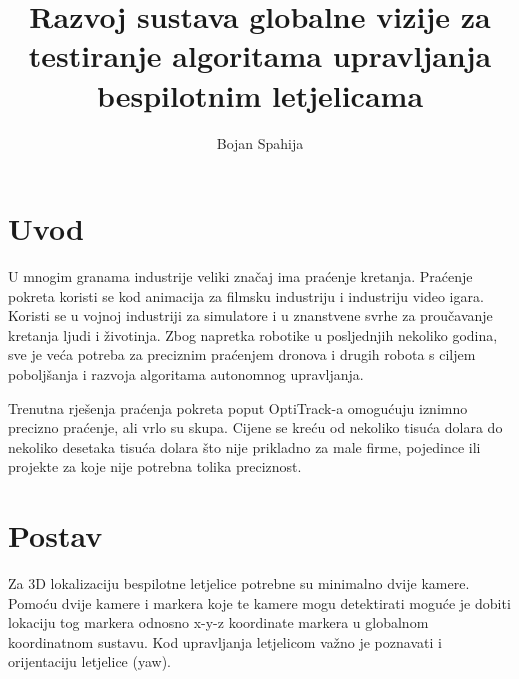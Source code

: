 \documentclass[times, utf8, diplomski]{fer}
\begin{document}

\title{Razvoj sustava globalne vizije za testiranje algoritama upravljanja bespilotnim letjelicama}

\author{Bojan Spahija}

\maketitle




\tableofcontents

\listoffigures

\chapter{Uvod}
U mnogim granama industrije veliki značaj ima praćenje kretanja. Praćenje pokreta koristi se kod animacija za filmsku industriju i industriju video igara. Koristi se u vojnoj industriji za simulatore i u znanstvene svrhe za proučavanje kretanja ljudi i životinja. Zbog napretka robotike u posljednjih nekoliko godina, sve je veća potreba za preciznim praćenjem dronova i drugih robota s ciljem poboljšanja i razvoja algoritama autonomnog upravljanja.

Trenutna rješenja praćenja pokreta poput OptiTrack-a omogućuju iznimno precizno praćenje, ali vrlo su skupa. Cijene se kreću od nekoliko tisuća dolara do nekoliko desetaka tisuća dolara što nije prikladno za male firme, pojedince ili projekte za koje nije potrebna tolika preciznost. 

\chapter{Postav}
Za 3D lokalizaciju bespilotne letjelice potrebne su minimalno dvije kamere. Pomoću dvije kamere i markera koje te kamere mogu detektirati moguće je dobiti lokaciju tog markera odnosno x-y-z koordinate markera u globalnom koordinatnom sustavu. Kod upravljanja letjelicom važno je poznavati i orijentaciju letjelice (yaw). 
\end{document}
